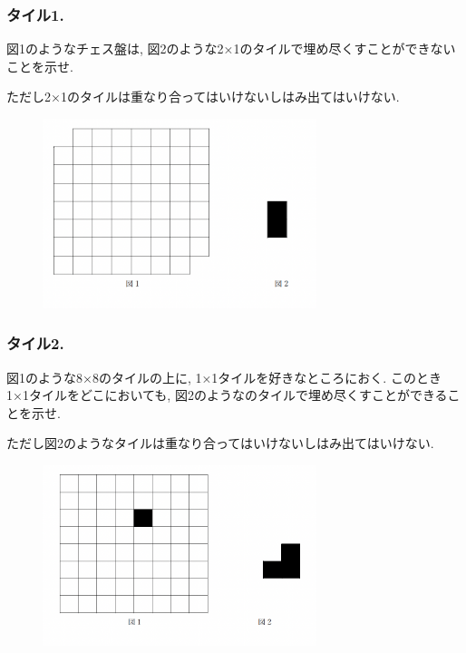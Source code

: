\documentclass[11pt,dvipdfmx]{beamer}
\theoremstyle{definition}
\theoremstyle{remark}
\begin{document}
\begin{frame}
\frametitle{タイル1. }
図1のようなチェス盤は, 図2のような2×1のタイルで埋め尽くすことができないことを示せ.

ただし2×1のタイルは重なり合ってはいけないしはみ出てはいけない.
\begin{figure}[htbp]
\begin{center}
\includegraphics[width=80mm]{tile1.png}
\end{center}
\end{figure}
\end{frame}



\begin{frame}
\frametitle{タイル2. }
図1のような8×8のタイルの上に, 1×1タイルを好きなところにおく. 
このとき1×1タイルをどこにおいても, 図2のようなのタイルで埋め尽くすことができることを示せ.

ただし図2のようなタイルは重なり合ってはいけないしはみ出てはいけない.
\begin{figure}[htbp]
\begin{center}
\includegraphics[width=80mm]{tile2.png}
\end{center}
\end{figure}
\end{frame}
\end{document}
